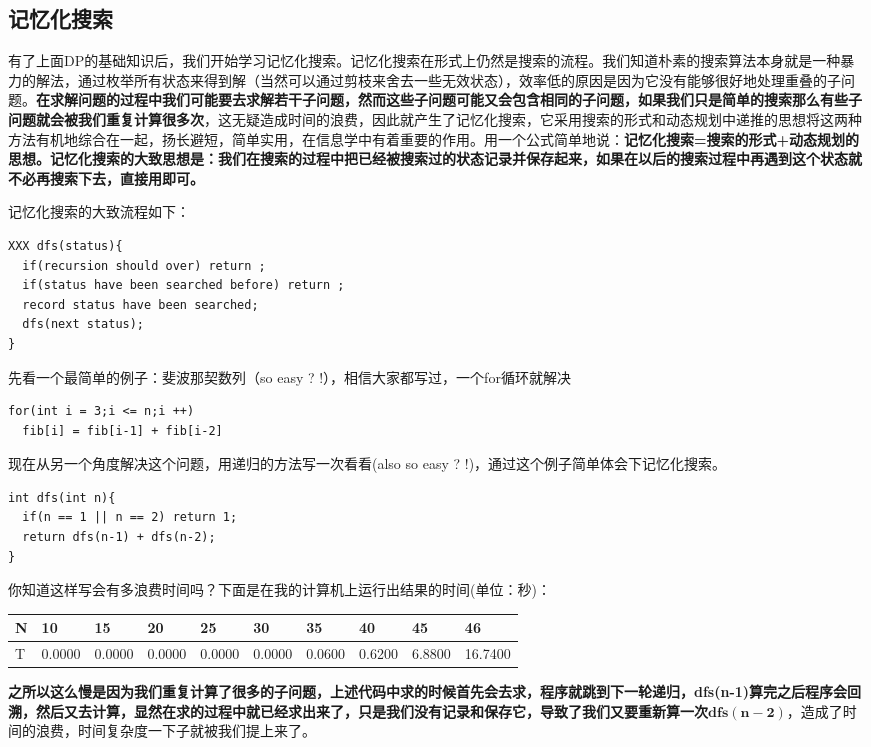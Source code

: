 \documentclass[a4paper,10pt]{article}
\begin{document}
\begin{CJK}{UTF8}{gbsn}
\section{记忆化搜索}
有了上面DP的基础知识后，我们开始学习记忆化搜索。记忆化搜索在形式上仍然是搜索的流程。我们知道朴素的搜索算法本身就是一种暴力的解法，通过枚举所有状态来得到解（当然可以通过剪枝来舍去一些无效状态），效率低的原因是因为它没有能够很好地处理重叠的子问题。\textbf{在求解问题的过程中我们可能要去求解若干子问题，然而这些子问题可能又会包含相同的子问题，如果我们只是简单的搜索那么有些子问题就会被我们重复计算很多次}，这无疑造成时间的浪费，因此就产生了记忆化搜索，它采用搜索的形式和动态规划中递推的思想将这两种方法有机地综合在一起，扬长避短，简单实用，在信息学中有着重要的作用。用一个公式简单地说：\textbf{记忆化搜索=搜索的形式+动态规划的思想。}\textbf{记忆化搜索的大致思想是：我们在搜索的过程中把已经被搜索过的状态记录并保存起来，如果在以后的搜索过程中再遇到这个状态就不必再搜索下去，直接用即可。}\par
记忆化搜索的大致流程如下：\par
\begin{lstlisting}
XXX dfs(status){
  if(recursion should over) return ;
  if(status have been searched before) return ;
  record status have been searched;
  dfs(next status);
}
\end{lstlisting}
先看一个最简单的例子：斐波那契数列（so easy ? !），相信大家都写过，一个for循环就解决
\begin{lstlisting}
for(int i = 3;i <= n;i ++)
  fib[i] = fib[i-1] + fib[i-2]
\end{lstlisting}
现在从另一个角度解决这个问题，用递归的方法写一次看看(also so easy ? !)，通过这个例子简单体会下记忆化搜索。\par
\begin{lstlisting}
int dfs(int n){
  if(n == 1 || n == 2) return 1;
  return dfs(n-1) + dfs(n-2);
}
\end{lstlisting}
你知道这样写会有多浪费时间吗？下面是在我的计算机上运行出结果的时间(单位：秒)：
\begin{center}
    \begin{tabular}{| l | l | l | l | l | l | l | l | l  | p{1cm} |}   \hline
    N & 10 & 15 & 20 & 25 & 30 & 35 & 40 & 45 & 46 \\ \hline
    T & 0.0000 &  0.0000 & 0.0000 & 0.0000 & 0.0000 & 0.0600 & 0.6200 & 6.8800 & 16.7400 \\ \hline
    \end{tabular}
\end{center}
\textbf{之所以这么慢是因为我们重复计算了很多的子问题，上述代码中求的时候首先会去求，程序就跳到下一轮递归，dfs(n-1)算完之后程序会回溯，然后又去计算，显然在求的过程中就已经求出来了，只是我们没有记录和保存它，导致了我们又要重新算一次$\bm{dfs(n-2)}$}，造成了时间的浪费，时间复杂度一下子就被我们提上来了。\par

\end{CJK}
\end{document}
